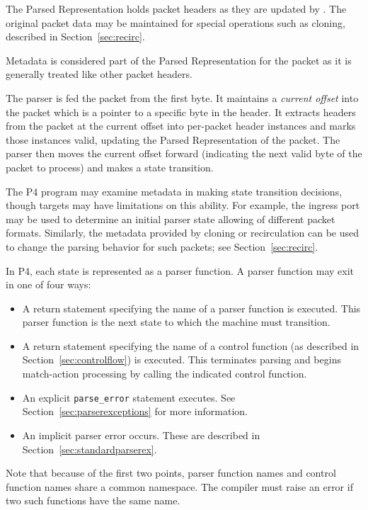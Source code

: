 \documentclass[12pt]{article}
\begin{document}
The Parsed Representation holds packet headers as they are updated by \matchaction. 
The original packet data may be maintained for special operations such as 
cloning, described in Section~\ref{sec:recirc}.

Metadata is considered part of the Parsed Representation for the packet as 
it is generally treated like other packet headers.


The parser is fed the packet from the first byte. It maintains a \textit{current 
offset} into the packet which is a pointer to a specific byte in the header. It 
extracts headers from the packet at the current offset into per-packet header 
instances and marks those instances valid, updating the Parsed Representation 
of the packet. The parser then moves the current offset forward (indicating 
the next valid byte of the packet to process) and makes a state transition.

The P4 program may examine metadata in making state transition decisions, 
though targets may have limitations on this ability.  For example, the ingress 
port may be used to determine an initial parser state allowing of different 
packet formats. Similarly, the metadata provided by cloning or recirculation 
can be used to change the parsing behavior for such packets; see 
Section~\ref{sec:recirc}.

In P4, each state is represented as a parser function. A parser function may 
exit in one of four ways:

\begin{itemize}
\item
A return statement specifying the name of a parser function is executed.  This 
parser function is the next state to which the machine must transition.
\item
A return statement specifying the name of a control function (as described 
in Section~\ref{sec:controlflow}) is executed. This terminates 
parsing and begins match-action processing by calling the indicated control 
function.
\item
An explicit \texttt{parse_error} statement executes. 
See Section~\ref{sec:parserexceptions} for more information.
\item
An implicit parser error occurs. These are described in 
Section~\ref{sec:standardparserex}.
\end{itemize}

Note that because of the first two points, parser function names and
control function names share a common namespace.  The compiler must
raise an error if two such functions have the same name.
\end{document}
